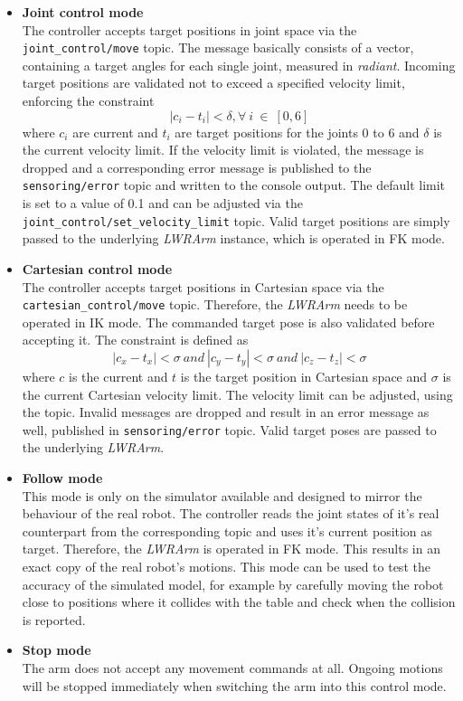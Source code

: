 \begin{itemize}

\item \textbf{Joint control mode} \\
The controller accepts target positions in joint space via the \texttt{joint\_control/move} topic. The message basically consists of a vector, containing a target angles for each single joint, measured in \emph{radiant}. Incoming target positions are validated not to exceed a specified velocity limit, enforcing the constraint
\begin{equation}
  |c_{i}-t_{i}|<\delta, \forall ~i~\in~[0,6]
\end{equation}
where $c_{i}$ are current and $t_{i}$ are target positions for the joints 0 to 6 and $\delta$ is the current velocity limit. If the velocity limit is violated, the message is dropped and a corresponding error message is published to the \texttt{sensoring/error} topic and written to the console output. The default limit is set to a value of 0.1 and can be adjusted via the \texttt{joint\_control/set\_velocity\_limit} topic. Valid target positions are simply passed to the underlying \emph{LWRArm} instance, which is operated in FK mode.

\item \textbf{Cartesian control mode} \\
The controller accepts target positions in Cartesian space via the \texttt{cartesian\_control/move} topic. Therefore, the \emph{LWRArm} needs to be operated in IK mode. The commanded target pose is also validated before accepting it. The constraint is defined as
\begin{equation}
  |c_{x}-t_{x}|<\sigma ~and~ |c_{y}-t_{y}|<\sigma ~and~ |c_{z}-t_{z}|<\sigma
\end{equation}
where $c$ is the current and $t$ is the target position in Cartesian space and $\sigma$ is the current Cartesian velocity limit. The velocity limit can be adjusted, using the  topic. Invalid messages are dropped and result in an error message as well, published in \texttt{sensoring/error} topic. Valid target poses are passed to the underlying \emph{LWRArm}.

\item \textbf{Follow mode} \\
This mode is only on the simulator available and designed to mirror the behaviour of the real robot. The controller reads the joint states of it's real counterpart from the corresponding topic and uses it's current position as target. Therefore, the \emph{LWRArm} is operated in FK mode. This results in an exact copy of the real robot's motions. This mode can be used to test the accuracy of the simulated model, for example by carefully moving the robot close to positions where it collides with the table and check when the collision is reported. 

\item \textbf{Stop mode} \\
The arm does not accept any movement commands at all. Ongoing motions will be stopped immediately when switching the arm into this control mode.

\end{itemize}


